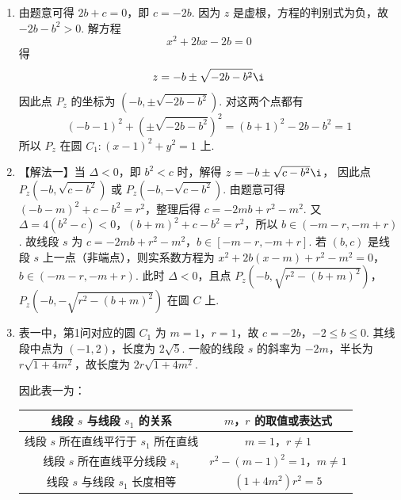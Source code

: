 \begin{solution}
\begin{enumerate}
\item 由题意可得 \(2b+c=0\)，即 \(c=-2b\). 因为 \(z\) 是虚根，方程的判别式为负，故 \(-2b-b^2>0\). 解方程
\[
x^2+2bx-2b=0
\]
得
\[
z=-b\pm\sqrt{-2b-b^2}\i
\]
因此点 \(P_z\) 的坐标为 \((-b,\pm\sqrt{-2b-b^2})\). 对这两个点都有
\[
(-b-1)^2+\left(\pm\sqrt{-2b-b^2}\right)^2
=(b+1)^2-2b-b^2=1
\]
所以 \(P_z\) 在圆 \(C_1:(x-1)^2+y^2=1\) 上.

\item 【解法一】当 \(\Delta<0\)，即 \(b^2<c\) 时，解得
\(z=-b\pm\sqrt{c-b^2}\i\)，
因此点 \(P_z(-b,\sqrt{c-b^2})\) 或 \(P_z(-b,-\sqrt{c-b^2})\).
由题意可得
\((-b-m)^2+c-b^2=r^2\)，整理后得 \(c=-2mb+r^2-m^{2}\).
又 \(\Delta=4(b^2-c)<0\)，\((b+m)^2+c-b^2=r^2\)，所以 \(b\in(-m-r,-m+r)\). 故线段 \(s\) 为 \(c=-2mb+r^2-m^{2}\)，\(b\in[-m-r,-m+r]\).
若 \((b,c)\) 是线段 \(s\) 上一点（非端点），则实系数方程为
\(x^2+2b(x-m)+r^2-m^{2}=0\)，\(b\in(-m-r,-m+r)\).
此时 \(\Delta<0\)，且点 \(P_z(-b,\sqrt{r^2-(b+m)^2})\)，\(P_z(-b,-\sqrt{r^2-(b+m)^2})\) 在圆 \(C\) 上.

\item 表一中，第1问对应的圆 \(C_1\) 为 \(m=1\)，\(r=1\)，故
\(c=-2b\)，\(-2\leqslant b\leqslant0\).
其线段中点为 \((-1,2)\)，长度为 \(2\sqrt5\). 一般的线段 \(s\) 的斜率为 \(-2m\)，半长为 \(r\sqrt{1+4m^2}\)，故长度为 \(2r\sqrt{1+4m^2}\).

因此表一为：

\centering
\begin{tabular}{|c|c|}
\hline
线段 \(s\) 与线段 \(s_1\) 的关系 & \(m\)，\(r\) 的取值或表达式 \\
\hline
线段 \(s\) 所在直线平行于 \(s_1\) 所在直线 & \(m=1\)，\(r\neq 1\) \\
\hline
线段 \(s\) 所在直线平分线段 \(s_1\) & \(r^2-\left(m-1\right)^2=1\)，\(m\neq 1\) \\
\hline
线段 \(s\) 与线段 \(s_1\) 长度相等 & \(\left(1+4m^2\right)r^2=5\) \\
\hline
\end{tabular}
\end{enumerate}
\end{solution}
